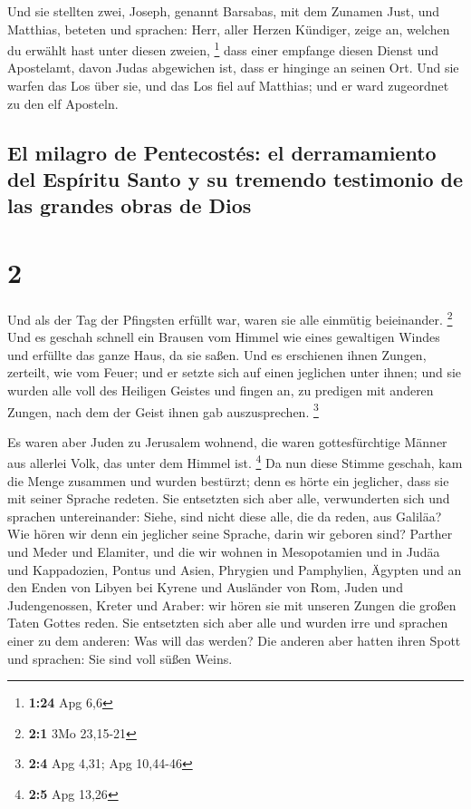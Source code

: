  Und sie stellten zwei, Joseph, genannt Barsabas, mit dem
Zunamen Just, und Matthias,  beteten und sprachen: Herr,
aller Herzen Kündiger, zeige an, welchen du erwählt hast unter diesen
zweien, \footnote{\textbf{1:24} Apg 6,6}  dass einer
empfange diesen Dienst und Apostelamt, davon Judas abgewichen ist, dass
er hinginge an seinen Ort.  Und sie warfen das Los über
sie, und das Los fiel auf Matthias; und er ward zugeordnet zu den elf
Aposteln.

\hypertarget{el-milagro-de-pentecostuxe9s-el-derramamiento-del-espuxedritu-santo-y-su-tremendo-testimonio-de-las-grandes-obras-de-dios}{%
\subsection{El milagro de Pentecostés: el derramamiento del Espíritu
Santo y su tremendo testimonio de las grandes obras de
Dios}\label{el-milagro-de-pentecostuxe9s-el-derramamiento-del-espuxedritu-santo-y-su-tremendo-testimonio-de-las-grandes-obras-de-dios}}

\hypertarget{section-1}{%
\section{2}\label{section-1}}

 Und als der Tag der Pfingsten erfüllt war, waren sie alle
einmütig beieinander. \footnote{\textbf{2:1} 3Mo 23,15-21}
 Und es geschah schnell ein Brausen vom Himmel wie eines
gewaltigen Windes und erfüllte das ganze Haus, da sie saßen.
 Und es erschienen ihnen Zungen, zerteilt, wie vom Feuer;
und er setzte sich auf einen jeglichen unter ihnen;  und
sie wurden alle voll des Heiligen Geistes und fingen an, zu predigen mit
anderen Zungen, nach dem der Geist ihnen gab auszusprechen. \footnote{\textbf{2:4}
  Apg 4,31; Apg 10,44-46}

 Es waren aber Juden zu Jerusalem wohnend, die waren
gottesfürchtige Männer aus allerlei Volk, das unter dem Himmel ist.
\footnote{\textbf{2:5} Apg 13,26}  Da nun diese Stimme
geschah, kam die Menge zusammen und wurden bestürzt; denn es hörte ein
jeglicher, dass sie mit seiner Sprache redeten.  Sie
entsetzten sich aber alle, verwunderten sich und sprachen untereinander:
Siehe, sind nicht diese alle, die da reden, aus Galiläa? 
Wie hören wir denn ein jeglicher seine Sprache, darin wir geboren sind?
 Parther und Meder und Elamiter, und die wir wohnen in
Mesopotamien und in Judäa und Kappadozien, Pontus und Asien,
 Phrygien und Pamphylien, Ägypten und an den Enden von
Libyen bei Kyrene und Ausländer von Rom,  Juden und
Judengenossen, Kreter und Araber: wir hören sie mit unseren Zungen die
großen Taten Gottes reden.  Sie entsetzten sich aber alle
und wurden irre und sprachen einer zu dem anderen: Was will das werden?
 Die anderen aber hatten ihren Spott und sprachen: Sie
sind voll süßen Weins.

